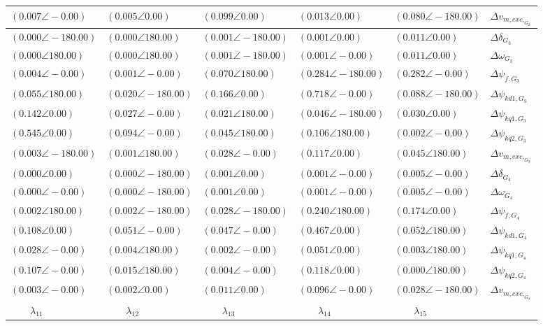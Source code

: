 \begin{tabular}{lllll|l}
$(0.007 \angle -0.00)$	& $(0.005 \angle 0.00)$	& $\mathbf{(0.099 \angle 0.00)}$	& $(0.013 \angle 0.00)$	& $\mathbf{(0.080 \angle -180.00)}$	& $\Delta v_{m,exc,_{G_2}}$ \\ 
 \hline 
$(0.000 \angle -180.00)$	& $(0.000 \angle 180.00)$	& $(0.001 \angle -180.00)$	& $(0.001 \angle 0.00)$	& $(0.011 \angle 0.00)$	& $\Delta\delta_{G_3}$ \\ 
$(0.000 \angle 180.00)$	& $(0.000 \angle 180.00)$	& $(0.001 \angle -180.00)$	& $(0.001 \angle -0.00)$	& $(0.011 \angle 0.00)$	& $\Delta\omega_{G_3}$ \\ 
$(0.004 \angle -0.00)$	& $(0.001 \angle -0.00)$	& $\mathbf{(0.070 \angle 180.00)}$	& $\mathbf{(0.284 \angle -180.00)}$	& $\mathbf{(0.282 \angle -0.00)}$	& $\Delta \psi_{f,G_3}$ \\ 
$\mathbf{(0.055 \angle 180.00)}$	& $(0.020 \angle -180.00)$	& $\mathbf{(0.166 \angle 0.00)}$	& $\mathbf{(0.718 \angle -0.00)}$	& $\mathbf{(0.088 \angle -180.00)}$	& $\Delta \psi_{kd1,G_3}$ \\ 
$\mathbf{(0.142 \angle 0.00)}$	& $(0.027 \angle -0.00)$	& $(0.021 \angle 180.00)$	& $(0.046 \angle -180.00)$	& $(0.030 \angle 0.00)$	& $\Delta \psi_{kq1,G_3}$ \\ 
$\mathbf{(0.545 \angle 0.00)}$	& $\mathbf{(0.094 \angle -0.00)}$	& $(0.045 \angle 180.00)$	& $\mathbf{(0.106 \angle 180.00)}$	& $(0.002 \angle -0.00)$	& $\Delta \psi_{kq2,G_3}$ \\ 
$(0.003 \angle -180.00)$	& $(0.001 \angle 180.00)$	& $(0.028 \angle -0.00)$	& $\mathbf{(0.117 \angle 0.00)}$	& $(0.045 \angle 180.00)$	& $\Delta v_{m,exc,_{G_3}}$ \\ 
 \hline 
$(0.000 \angle 0.00)$	& $(0.000 \angle -180.00)$	& $(0.001 \angle 0.00)$	& $(0.001 \angle -0.00)$	& $(0.005 \angle -0.00)$	& $\Delta\delta_{G_4}$ \\ 
$(0.000 \angle -0.00)$	& $(0.000 \angle -180.00)$	& $(0.001 \angle 0.00)$	& $(0.001 \angle -0.00)$	& $(0.005 \angle -0.00)$	& $\Delta\omega_{G_4}$ \\ 
$(0.002 \angle 180.00)$	& $(0.002 \angle -180.00)$	& $(0.028 \angle -180.00)$	& $\mathbf{(0.240 \angle 180.00)}$	& $\mathbf{(0.174 \angle 0.00)}$	& $\Delta \psi_{f,G_4}$ \\ 
$\mathbf{(0.108 \angle 0.00)}$	& $\mathbf{(0.051 \angle -0.00)}$	& $(0.047 \angle -0.00)$	& $\mathbf{(0.467 \angle 0.00)}$	& $\mathbf{(0.052 \angle 180.00)}$	& $\Delta \psi_{kd1,G_4}$ \\ 
$(0.028 \angle -0.00)$	& $(0.004 \angle 180.00)$	& $(0.002 \angle -0.00)$	& $\mathbf{(0.051 \angle 0.00)}$	& $(0.003 \angle 180.00)$	& $\Delta \psi_{kq1,G_4}$ \\ 
$\mathbf{(0.107 \angle -0.00)}$	& $(0.015 \angle 180.00)$	& $(0.004 \angle -0.00)$	& $\mathbf{(0.118 \angle 0.00)}$	& $(0.000 \angle 180.00)$	& $\Delta \psi_{kq2,G_4}$ \\ 
$(0.003 \angle -0.00)$	& $(0.002 \angle 0.00)$	& $(0.011 \angle 0.00)$	& $\mathbf{(0.096 \angle -0.00)}$	& $(0.028 \angle -180.00)$	& $\Delta v_{m,exc,_{G_4}}$ \\ 
 \hline 
\hline 
$\qquad\lambda_{11}$	&$\qquad\lambda_{12}$	&$\qquad\lambda_{13}$	&$\qquad\lambda_{14}$	&$\qquad\lambda_{15}$	&
\end{tabular}

